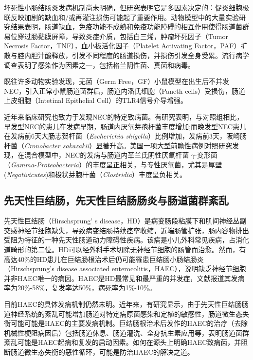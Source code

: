 坏死性小肠结肠炎发病机制尚未明确，但研究表明它是多因素决定的：促炎细胞极联反映加剧的缺血和/或再灌注损伤可能起了重要作用。动物模型中的大量实验研究结果表明，肠道缺血，免疫功能不成熟和免疫功能障碍的相互作用使得肠道菌群易位穿过肠黏膜屏障，导致炎症介质，包括白三烯，肿瘤坏死因子（Tumor Necrosis Factor，TNF），血小板活化因子（Platelet Activating Factor，PAF）扩散与腔内胆汁酸释放，引发不同程度的肠道损伤，并损伤引发全身受累\cite{good2015breast,miller1990casein}。流行病学调查表明了感染作为因素之一，包括格兰阴性菌、真菌和病毒\cite{de2004early,hodzic2017role,denning2017pathogenesis}。

既往许多动物实验发现，无菌（Germ Free，GF）小鼠模型在出生后不并发NEC\cite{rozenfeld2001role}，引入正常小鼠肠道菌群后，肠道内潘氏细胞（Paneth cells）受损伤，肠道上皮细胞（Intetinal Epithelial Cell）的TLR4信号介导增强\cite{white2017paneth}。

近年来临床研究也致力于发现NEC的特定致病菌。有研究表明，与对照组相比，早发型NEC的患儿在发病早期，肠道内厌氧芽孢杆菌丰度增加;而晚发型NEC患儿在发病前6天大肠志贺杆菌（\textit{Escherichia shigella}）比例增加，发病前3天，阪崎肠杆菌（\textit{Cronobacter sakazakii}）显著升高\cite{zhou2015longitudinal}。美国一项大型前瞻性病例对照研究发现，在混合模型中，NEC的发病与肠道内革兰氏阴性厌氧杆菌 $\gamma$-变形菌（\textit{Gamma-Proteobacteria}）的丰度呈正相关，与专性厌氧菌，尤其是厚壁(\textit{Negativicutes})和梭状芽胞杆菌（\textit{Clostridia}）丰度呈负相关\cite{la2014patterned}。

\subsection{先天性巨结肠，先天性巨结肠肠炎与肠道菌群紊乱}
先天性巨结肠（Hirschsprung’ s disease，HD）是病变肠段粘膜下和肌间神经丛副交感神经节细胞缺失，导致病变结肠持续痉挛收缩，近端肠管扩张，肠内容物排出受阻为特征的一种先天性肠道动力障碍性疾病。该病是小儿外科常见疾病，占消化道畸形的第二位\cite{langer1999transanal}。HD可以经外科手术切除无神经节细胞的肠管而治愈。然而，有高达40\%的HD患儿在巨结肠根治术后仍可能罹患巨结肠小肠结肠炎（Hirschsprung’s disease associated enterocolitis，HAEC），说明缺乏神经节细胞并非HAEC唯一的病因。HAEC是HD最常见和最严重的并发症，文献报道其发病率为20\%-58\%，复发率达50\%，病死率为1\%-10\%\cite{frykman2012hirschsprung}。

目前HAEC的具体发病机制仍然未明\cite{austin2012pathogenesis}。近年来，有研究显示，由于先天性巨结肠肠道神经系统的紊乱可能增加肠道对特定病原菌感染和定植的敏感性，肠道微生态失衡可能可能是HAEC的主要发病机制\cite{frykman2012hirschsprung}。巨结肠根治术后发作的HAEC的治疗（去除机械性梗阻病因后）包括肠道休息、肠道灌洗、全身抗生素应用等，表明肠道菌群紊乱可能是HAEC起病和复发的启动因素。如何在源头上明确HAEC致病菌，并阻断肠道微生态失衡的恶性循环，可能是防治HAEC的解决之道。

